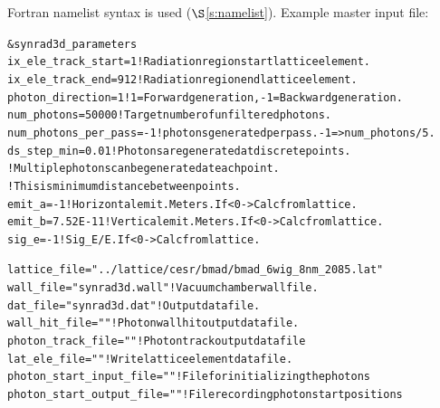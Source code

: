 \documentclass[11pt,openany]{report}
\newcommand{\sref}[1]{$\S$\ref{#1}}
\newlength{\ExBeg}
\newlength{\ExEnd}
\newenvironment{example}
  {\vspace{\ExBeg} \begin{alltt}}
  {\end{alltt} \vspace{\ExEnd}}
\begin{document}
Fortran namelist syntax is used (\sref{s:namelist}). Example master input file:
\begin{example}
  &synrad3d_parameters
    ix_ele_track_start   = 1      ! Radiation region start lattice element.
    ix_ele_track_end     = 912    ! Radiation region end lattice element.
    photon_direction     = 1      ! 1 = Forward generation, -1 = Backward generation.
    num_photons          = 50000  ! Target number of unfiltered photons.
    num_photons_per_pass = -1     ! photons generated per pass. -1 => num_photons/5.
    ds_step_min          = 0.01   ! Photons are generated at discrete points. 
                              ! Multiple photons can be generated at each point.
                              ! This is minimum distance between points.
    emit_a       = -1         ! Horizontal emit. Meters. If < 0 -> Calc from lattice.
    emit_b       = 7.52E-11   ! Vertical emit.  Meters. If < 0 -> Calc from lattice.
    sig_e        = -1         ! Sig_E/E. If < 0 -> Calc from lattice.

    lattice_file = "../lattice/cesr/bmad/bmad_6wig_8nm_2085.lat" 
    wall_file    = "synrad3d.wall"   ! Vacuum chamber wall file.
    dat_file     = "synrad3d.dat"    ! Output data file.
    wall_hit_file = ""               ! Photon wall hit output data file.
    photon_track_file = ""           ! Photon track output data file
    lat_ele_file  = ""               ! Write lattice element data file.
    photon_start_input_file  = ""    ! File for initializing the photons
    photon_start_output_file = ""    ! File recording photon start positions


\end{example}
\end{document}
